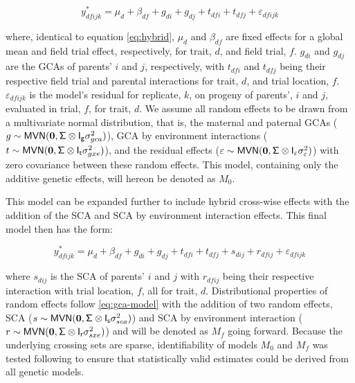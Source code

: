 \begin{refsection}
\begin{equation}
  y_{dfijk}^* = \mu_d + \beta_{df} + g_{di} + g_{dj} + t_{dfi} + t_{dfj} + \varepsilon_{dfijk}
  \label{eq:gca-model}
\end{equation}

where, identical to equation \eqref{eq:hybrid}, \(\mu_d\) and \(\beta_{df}\) are fixed effects for a global mean and field trial effect, respectively, for trait, \(d\), and field trial, \(f\). \(g_{di}\) and \(g_{dj}\) are the GCAs of parents' \(i\) and \(j\), respectively, with \(t_{dfi}\) and \(t_{dfj}\) being their respective field trial and parental interactions for trait, \(d\), and trial location, \(f\). \(\varepsilon_{dfijk}\) is the model's residual for replicate, \(k\), on progeny of parents', \(i\) and \(j\), evaluated in trial, \(f\), for trait, \(d\). We assume all random effects to be drawn from a multivariate normal distribution, that is, the maternal and paternal GCAs (\(g\sim \mathsf{MVN}({\bf 0},\mathsf{\Sigma\otimes I_g}\sigma_{gca}^2)\)), GCA by environment interactions (\(t\sim \mathsf{MVN}({\bf 0},\mathsf{\Sigma\otimes I_t}\sigma_{gxe}^2)\)), and the residual effects (\(\varepsilon\sim \mathsf{MVN}({\bf 0},\mathsf{\Sigma\otimes I}_\varepsilon \sigma_\varepsilon^2)\)) with zero covariance between these random effects. This model, containing only the additive genetic effects, will hereon be denoted as \(M_0\).

This model can be expanded further to include hybrid cross-wise effects with the addition of the SCA and SCA by environment interaction effects. This final model then has the form:

\begin{equation}
  y_{dfijk}^* = \mu_d + \beta_{df} + g_{di} + g_{dj} + t_{dfi} + t_{dfj} + s_{dij} + r_{dfij} + \varepsilon_{dfijk}
  \label{eq:sca-model}
\end{equation}

where \(s_{dij}\) is the SCA of parents' \(i\) and \(j\) with \(r_{dfij}\) being their respective interaction with trial location, \(f\), all for trait, \(d\). Distributional properties of random effects follow \eqref{eq:gca-model} with the addition of two random effects, SCA (\(s\sim \mathsf{MVN}({\bf 0},\mathsf{\Sigma\otimes I_{s}}\sigma^2_{sca})\)) and SCA by environment interaction (\(r\sim \mathsf{MVN}({\bf 0},\mathsf{\Sigma\otimes I_{r}}\sigma^2_{sxe})\)) and will be denoted as \(M_f\) going forward. Because the underlying crossing sets are sparse, identifiability of models \(M_0\) and \(M_f\) was tested following \parencite{Xenakis2019} to ensure that statistically valid estimates could be derived from all genetic models.


\end{refsection}
